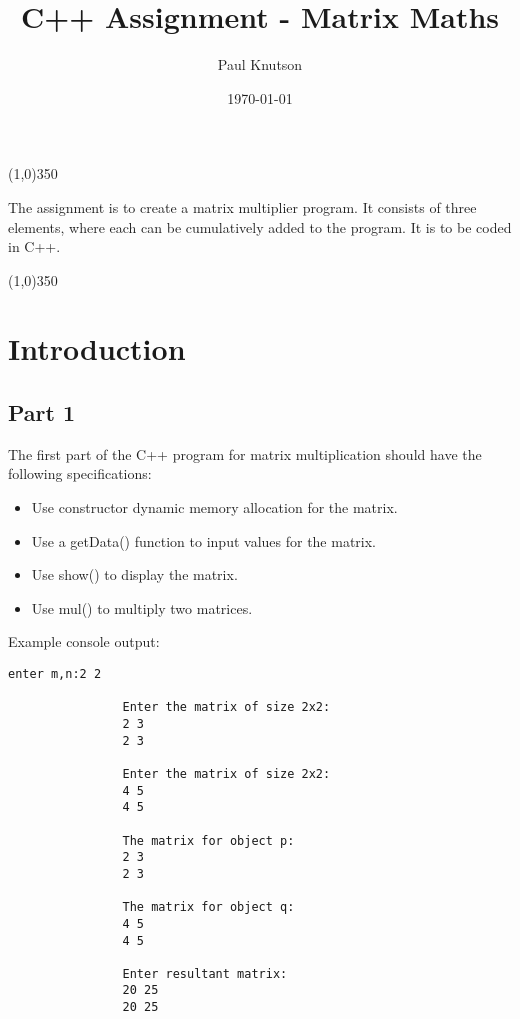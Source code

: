 \documentclass{article}
\begin{document}
	\title{C++ Assignment - Matrix Maths}
	\date{\today}
	\author{Paul Knutson}
	\maketitle
	\thispagestyle{empty}
	
	\begin{center}
		\line(1,0){350}
	
	\hfill \break
	The assignment is to create a matrix multiplier program. It consists of three elements, where each can be cumulatively added to the program. It is to be coded in C++.
	
		\line(1,0){350}
	\end{center}
	
	\clearpage

	\tableofcontents{}
	\clearpage
	
	
	
	\section{Introduction}
		\subsection{Part 1}
			The first part of the C++ program for matrix multiplication should have the following specifications:
			\begin{itemize}
				\item Use constructor dynamic memory allocation for the matrix.
				\item Use a getData() function to input values for the matrix.
				\item Use show() to display the matrix.
				\item Use mul() to multiply two matrices.
			\end{itemize}
		
			Example console output:
			\begin{lstlisting}[style=console]
				enter m,n:2 2
				
				Enter the matrix of size 2x2:
				2 3
				2 3
				
				Enter the matrix of size 2x2:
				4 5
				4 5
				
				The matrix for object p:
				2 3
				2 3
				
				The matrix for object q:
				4 5
				4 5
				
				Enter resultant matrix:
				20 25
				20 25
			\end{lstlisting}
		
\end{document}
